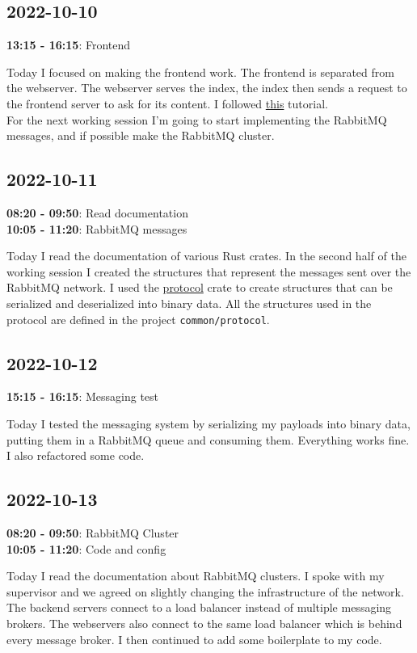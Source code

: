 \documentclass{article}
\begin{document}
\subsection{2022-10-10}

\textbf{13:15 - 16:15}: Frontend

Today I focused on making the frontend work. The frontend is separated from the webserver.
The webserver serves the index, the index then sends a request to the frontend server to ask for its content.
I followed \href{https://robert.kra.hn/posts/2022-04-03\_rust-web-wasm/}{this} tutorial. \\
For the next working session I'm going to start implementing the RabbitMQ
messages, and if possible make the RabbitMQ cluster.

\subsection{2022-10-11}

\textbf{08:20 - 09:50}: Read documentation \\
\textbf{10:05 - 11:20}: RabbitMQ messages

Today I read the documentation of various Rust crates. In the second
half of the working session I created the structures that represent the messages
sent over the RabbitMQ network. I used the \href{https://crates.io/crates/protocol}{protocol} crate to create structures
that can be serialized and deserialized into binary data. All the structures used in the protocol
are defined in the project \texttt{common/protocol}.

\subsection{2022-10-12}

\textbf{15:15 - 16:15}: Messaging test

Today I tested the messaging system by serializing my payloads into binary data,
putting them in a RabbitMQ queue and consuming them. Everything works fine.
I also refactored some code.

\subsection{2022-10-13}

\textbf{08:20 - 09:50}: RabbitMQ Cluster \\
\textbf{10:05 - 11:20}: Code and config

Today I read the documentation about RabbitMQ clusters.
I spoke with my supervisor and we agreed on slightly changing
the infrastructure of the network. The backend servers
connect to a load balancer instead of multiple messaging brokers.
The webservers also connect to the same load balancer which is behind
every message broker. I then continued to add some boilerplate to my code.
\end{document}
